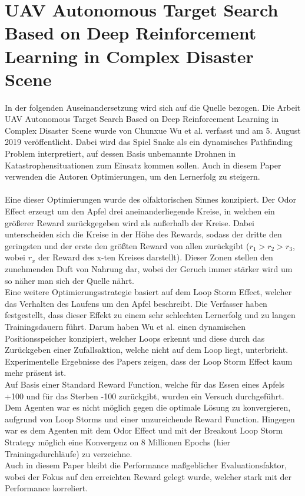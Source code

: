 \section{UAV Autonomous Target Search Based on Deep Reinforcement Learning in Complex Disaster Scene} \label{sec:Paper_2}
In der folgenden Auseinandersetzung wird sich auf die Quelle \cite{UAV} bezogen.
Die Arbeit UAV Autonomous Target Search Based on Deep Reinforcement Learning in Complex Disaster Scene wurde von Chunxue Wu et al. verfasst und am 5. August 2019 veröffentlicht. Dabei wird das Spiel Snake als ein dynamisches Pathfinding Problem interpretiert, auf dessen Basis unbemannte Drohnen in Katastrophensituationen zum Einsatz kommen sollen. Auch in diesem Paper verwenden die Autoren Optimierungen, um den Lernerfolg zu steigern.\\
\\ Eine dieser Optimierungen wurde des olfaktorischen Sinnes konzipiert. Der Odor Effect erzeugt um den Apfel drei aneinanderliegende Kreise, in welchen ein größerer Reward zurückgegeben wird als außerhalb der Kreise. Dabei unterscheiden sich die Kreise in der Höhe des Rewards, sodass der dritte den geringsten und der erste den größten Reward von allen zurückgibt ($r_1 > r_2 > r_3$, wobei $r_x$ der Reward des x-ten Kreises darstellt). Dieser Zonen stellen den zunehmenden Duft von Nahrung dar, wobei der Geruch immer stärker wird um so näher man sich der Quelle nährt.\\
Eine weitere Optimierungsstrategie basiert auf dem Loop Storm Effect, welcher das Verhalten des Laufens um den Apfel beschreibt. Die Verfasser haben festgestellt, dass dieser Effekt zu einem sehr schlechten Lernerfolg und zu langen Trainingsdauern führt. Darum haben Wu et al. einen dynamischen Positionsspeicher konzipiert, welcher Loops erkennt und diese durch das Zurückgeben einer Zufallsaktion, welche nicht auf dem Loop liegt, unterbricht. Experimentelle Ergebnisse des Papers zeigen, dass der Loop Storm Effect kaum mehr präsent ist.
\\ Auf Basis einer Standard Reward Function, welche für das Essen eines Apfels +100 und für das Sterben -100 zurückgibt, wurden ein Versuch durchgeführt. Dem Agenten war es nicht möglich gegen die optimale Lösung zu konvergieren, aufgrund von Loop Storms und einer unzureichende Reward Function. Hingegen war es dem Agenten mit dem Odor Effect und mit der Breakout Loop Storm Strategy möglich eine Konvergenz on 8 Millionen Epochs (hier Trainingsdurchläufe) zu verzeichne.\\
Auch in diesem Paper bleibt die Performance maßgeblicher Evaluationsfaktor, wobei der Fokus auf den erreichten Reward gelegt wurde, welcher stark mit der Performance korreliert.

